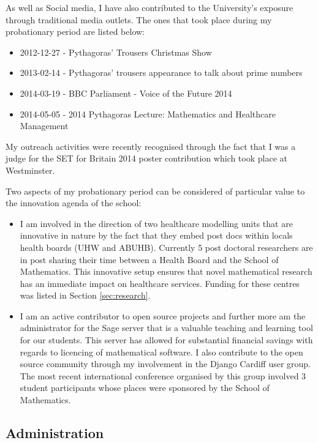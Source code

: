 \documentclass{article}
\begin{document}
As well as Social media, I have also contributed to the University's exposure through traditional media outlets.
The ones that took place during my probationary period are listed below:

\begin{itemize}
    \item 2012-12-27 - Pythagoras' Trousers Christmas Show
    \item 2013-02-14 - Pythagoras' trousers appearance to talk about prime numbers
    \item 2014-03-19 - BBC Parliament - Voice of the Future 2014
    \item 2014-05-05 - 2014 Pythagoras Lecture: Mathematics and Healthcare Management
\end{itemize}

My outreach activities were recently recognised through the fact that I was a judge for the SET for Britain 2014 poster contribution which took place at Westminster.

Two aspects of my probationary period can be considered of particular value to the innovation agenda of the school:

\begin{itemize}
    \item I am involved in the direction of two healthcare modelling units that are innovative in nature by the fact that they embed post docs within locals health boards (UHW and ABUHB).
          Currently 5 post doctoral researchers are in post sharing their time between a Health Board and the School of Mathematics.
          This innovative setup ensures that novel mathematical research has an immediate impact on healthcare services.
          Funding for these centres was listed in Section \ref{sec:research}.
    \item I am an active contributor to open source projects and further more am the administrator for the Sage server that is a valuable teaching and learning tool for our students.
          This server has allowed for substantial financial savings with regards to licencing of mathematical software.
          I also contribute to the open source community through my involvement in the Django Cardiff user group.
          The most recent international conference organised by this group involved 3 student participants whose places were sponsored by the School of Mathematics.
\end{itemize}

\subsection{Administration}
\end{document}
